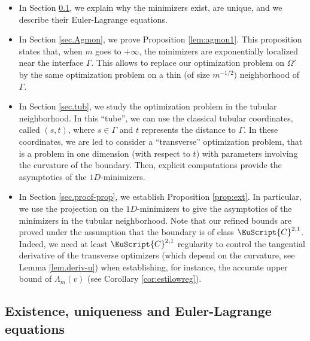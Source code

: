 \documentclass[10pt]{amsart}
\let\mathcal \EuScript
\newcommand{\cC}{\mathcal{C}}
\theoremstyle{plain}
\theoremstyle{definition}
\begin{document}
\begin{itemize}
\item In Section \ref{sec.exist-unique}, we explain why the minimizers exist, are unique, and we describe their Euler-Lagrange equations.
\item In Section \ref{sec.Agmon}, we prove Proposition \ref{lem:agmon1}. This proposition states that, when $m$ goes to $+\infty$, the minimizers are exponentially localized near the interface $\Gamma$. This allows to replace our optimization problem on $\Omega'$ by the same optimization problem on a thin (of size $m^{-1/2})$ neighborhood of $\Gamma$.
\item In Section \ref{sec.tub}, we study the optimization problem in the tubular neighborhood. In this \enquote{tube}, we can use the classical tubular coordinates, called $(s,t)$, where $s\in\Gamma$ and $t$ represents the distance to $\Gamma$. In these coordinates, we are led to consider a \enquote{transverse} optimization problem, that is a problem in one dimension (with respect to $t$) with parameters involving the curvature of the boundary. Then, explicit computations provide the asymptotics of the $1D$-minimizers.
\item In Section \ref{sec.proof-prop}, we establish Proposition \ref{prop:ext}. In particular, we use the projection on the $1D$-minimizers to give the asymptotics of the minimizers in the tubular neighborhood. Note that our refined bounds are proved under the assumption that the boundary is of class $\cC^{2,1}$. Indeed, we need at least $\cC^{2,1}$ regularity to control the tangential derivative of the transverse optimizers (which depend on the curvature, see Lemma \ref{lem.deriv-u}) when establishing, for instance, the accurate upper bound of $\Lambda_m(v)$ (see Corollary \ref{cor:estilowreg}).
\end{itemize}

\subsection{Existence, uniqueness and Euler-Lagrange equations}\label{sec.exist-unique}
\end{document}
